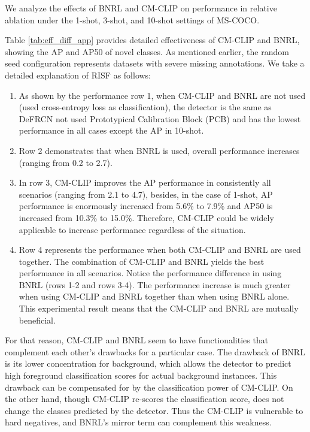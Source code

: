 \documentclass{article}
\begin{document}
We analyze the effects of BNRL and CM-CLIP on performance in relative ablation under the 1-shot, 3-shot, and 10-shot settings of MS-COCO.

Table \ref{tab:eff_diff_app} provides detailed effectiveness of CM-CLIP and BNRL, showing the AP and AP50 of novel classes.
As mentioned earlier, the random seed configuration represents datasets with severe missing annotations. We take a detailed explanation of RISF as follows:
\begin{enumerate}
    \item As shown by the performance row 1, when CM-CLIP and BNRL are not used (used cross-entropy loss as classification), the detector is the same as DeFRCN \cite{defrcn} not used Prototypical Calibration Block (PCB) and has the lowest performance in all cases except the AP in 10-shot.
    \item Row 2 demonstrates that when BNRL is used, overall performance increases (ranging from 0.2 to 2.7).
    \item In row 3, CM-CLIP improves the AP performance in consistently all scenarios (ranging from 2.1 to 4.7),
    besides, in the case of 1-shot, AP performance is enormously increased from 5.6\% to 7.9\% and AP50 is increased from 10.3\% to 15.0\%. 
    Therefore, CM-CLIP could be widely applicable to increase performance regardless of the situation.
    \item Row 4 represents the performance when both CM-CLIP and BNRL are used together. 
    The combination of CM-CLIP and BNRL yields the best performance in all scenarios. 
    Notice the performance difference in using BNRL (rows 1-2 and rows 3-4). The performance increase is much greater when using CM-CLIP and BNRL together than when using BNRL alone.
    This experimental result means that the CM-CLIP and BNRL are mutually beneficial.
\end{enumerate}

For that reason, CM-CLIP and BNRL seem to have functionalities that complement each other's drawbacks for a particular case. The drawback of BNRL is its lower concentration for background, which allows the detector to predict high foreground classification scores for actual background instances. This drawback can be compensated for by the classification power of CM-CLIP. On the other hand, though CM-CLIP re-scores the classification score, does not change the classes predicted by the detector. Thus the CM-CLIP is vulnerable to hard negatives, and BNRL's mirror term can complement this weakness. 
\end{document}
